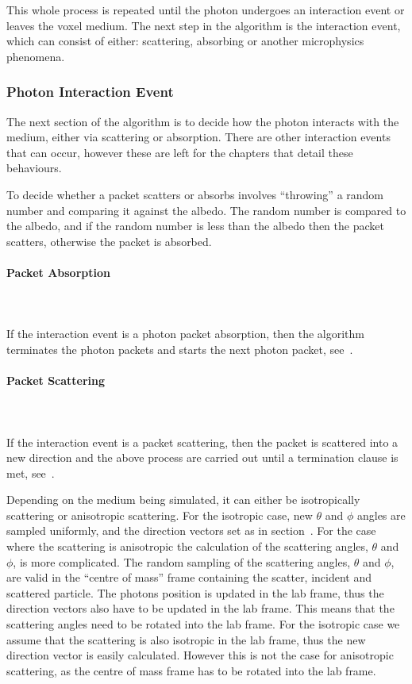This whole process is repeated until the photon undergoes an interaction event or leaves the voxel medium.
The next step in the algorithm is the interaction event, which can consist of either: scattering, absorbing or another microphysics phenomena. 

\subsubsection*{Photon Interaction Event}\label{sec:photscatterabsorb}

The next section of the algorithm is to decide how the photon interacts with the medium, either via scattering or absorption. There are other interaction events that can occur, however these are left for the chapters that detail these behaviours.
\medskip

To decide whether a packet scatters or absorbs involves ``throwing'' a random number and comparing it against the albedo. The random number is compared to the albedo, and if the random number is less than the albedo then the packet scatters, otherwise the packet is absorbed.

\paragraph{Packet Absorption}\hspace{0pt}\\
\\
If the interaction event is a photon packet absorption, then the algorithm terminates the photon packets and starts the next photon packet, see~.

\paragraph{Packet Scattering}\hspace{0pt}\\
\\
If the interaction event is a packet scattering, then the packet is scattered into a new direction and the above process are carried out until a termination clause is met, see~.

Depending on the medium being simulated, it can either be isotropically scattering or anisotropic scattering. 
For the isotropic case, new $\theta$ and $\phi$ angles are sampled uniformly, and the direction vectors set as in section~.
For the case where the scattering is anisotropic the calculation of the scattering angles, $\theta$ and $\phi$, is more complicated.
The random sampling of the scattering angles, $\theta$ and $\phi$, are valid in the ``centre of mass'' frame containing the scatter, incident and scattered particle.
The photons position is updated in the lab frame, thus the direction vectors also have to be updated in the lab frame.
This means that the scattering angles need to be rotated into the lab frame.
For the isotropic case we assume that the scattering is also isotropic in the lab frame, thus the new direction vector is easily calculated.
However this is not the case for anisotropic scattering, as the centre of mass frame has to be rotated into the lab frame.

